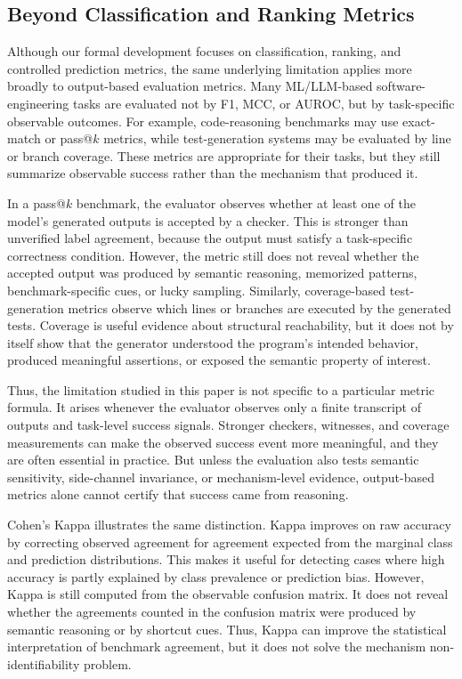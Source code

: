 \documentclass[acmsmall,screen,review,anonymous]{acmart}
\begin{document}
\subsection{Beyond Classification and Ranking Metrics}
\label{sec:discussion-output-metrics}

Although our formal development focuses on classification, ranking, and
controlled prediction metrics, the same underlying limitation applies more
broadly to output-based evaluation metrics. Many ML/LLM-based
software-engineering tasks are evaluated not by F1, MCC, or AUROC, but by
task-specific observable outcomes. For example, code-reasoning benchmarks may
use exact-match or pass@\(k\) metrics, while test-generation systems may be
evaluated by line or branch coverage. These metrics are appropriate for their
tasks, but they still summarize observable success rather than the mechanism
that produced it.

In a pass@\(k\) benchmark, the evaluator observes whether at least one of the
model's generated outputs is accepted by a checker. This is stronger than
unverified label agreement, because the output must satisfy a task-specific
correctness condition. However, the metric still does not reveal whether the
accepted output was produced by semantic reasoning, memorized patterns,
benchmark-specific cues, or lucky sampling. Similarly, coverage-based
test-generation metrics observe which lines or branches are executed by the
generated tests. Coverage is useful evidence about structural reachability,
but it does not by itself show that the generator understood the program's
intended behavior, produced meaningful assertions, or exposed the semantic
property of interest.

Thus, the limitation studied in this paper is not specific to a particular
metric formula. It arises whenever the evaluator observes only a finite
transcript of outputs and task-level success signals. Stronger checkers,
witnesses, and coverage measurements can make the observed success event more
meaningful, and they are often essential in practice. But unless the
evaluation also tests semantic sensitivity, side-channel invariance, or
mechanism-level evidence, output-based metrics alone cannot certify that
success came from reasoning.

Cohen's Kappa illustrates the same distinction. Kappa improves on raw
accuracy by correcting observed agreement for agreement expected from the
marginal class and prediction distributions. This makes it useful for
detecting cases where high accuracy is partly explained by class prevalence
or prediction bias. However, Kappa is still computed from the observable
confusion matrix. It does not reveal whether the agreements counted in the
confusion matrix were produced by semantic reasoning or by shortcut cues.
Thus, Kappa can improve the statistical interpretation of benchmark
agreement, but it does not solve the mechanism non-identifiability problem.
\end{document}
